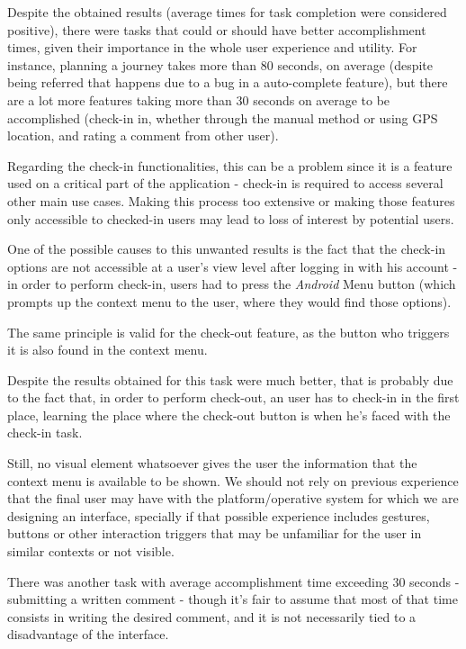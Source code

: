 Despite the obtained results (average times for task completion were considered positive), there were tasks that could or should have better accomplishment times, given their importance in the whole user experience and utility.
For instance, planning a journey takes more than 80 seconds, on average (despite being referred that happens due to a bug in a auto-complete feature), but there are a lot more features taking more than 30 seconds on average to be accomplished (check-in in, whether through the manual method or using GPS location, and rating a comment from other user). 

Regarding the check-in functionalities, this can be a problem since it is a feature used on a critical part of the application - check-in is required to access several other main use cases. Making this process too extensive or making those features only accessible to checked-in users may lead to loss of interest by potential users.

One of the possible causes to this unwanted results is the fact that the check-in options are not accessible at a user's view level after logging in with his account - in order to perform check-in, users had to press the \emph{Android} Menu button (which prompts up the context menu to the user, where they would find those options).

The same principle is valid for the check-out feature, as the button who triggers it is also found in the context menu. 

Despite the results obtained for this task were much better, that is probably due to the fact that, in order to perform check-out, an user has to check-in in the first place, learning the place where the check-out button is when he's faced with the check-in task.

Still, no visual element whatsoever gives the user the information that the context menu is available to be shown. We should not rely on previous experience that the final user may have with the platform/operative system for which we are designing an interface, specially if that possible experience includes gestures, buttons or other interaction triggers that may be unfamiliar for the user in similar contexts or not visible.

There was another task with average accomplishment time exceeding 30 seconds - submitting a written comment - though it's fair to assume that most of that time consists in writing the desired comment, and it is not necessarily tied to a disadvantage of the interface.

